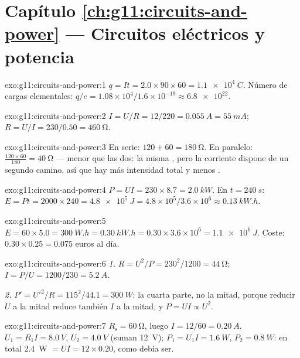 \section*{Capítulo \ref{ch:g11:circuits-and-power} --- Circuitos eléctricos y potencia}

\begin{solution}{exo:g11:circuits-and-power:1}
$q = It = 2.0 \times 90 \times 60 = \qty{1.1e4}{C}$. Número de cargas
elementales:
$q/e = 1.08\times10^{4}/1.6\times10^{-19} \approx \num{6.8e22}$.
\end{solution}

\begin{solution}{exo:g11:circuits-and-power:2}
$I = U/R = 12/220 = \qty{0.055}{A} = \qty{55}{mA}$;
$R = U/I = 230/0.50 = \qty{460}{\ohm}$.
\end{solution}

\begin{solution}{exo:g11:circuits-and-power:3}
En serie: $120 + 60 = \qty{180}{\ohm}$. En paralelo:
$\frac{120 \times 60}{180} = \qty{40}{\ohm}$ --- menor que las dos:
la misma , pero la corriente dispone de un segundo camino, así
que hay más intensidad total y menos .
\end{solution}

\begin{solution}{exo:g11:circuits-and-power:4}
$P = UI = 230 \times 8.7 = \qty{2.0}{kW}$. En $t = \qty{240}{s}$:
$E = Pt = 2000 \times 240 = \qty{4.8e5}{J} = 4.8\times10^{5}/3.6
\times10^{6} \approx \qty{0.13}{kW.h}$.
\end{solution}

\begin{solution}{exo:g11:circuits-and-power:5}
$E = 60 \times 5.0 = \qty{300}{W.h} = \qty{0.30}{kW.h} = 0.30 \times
3.6\times10^{6} = \qty{1.1e6}{J}$. Coste: $0.30 \times 0.25 = 0.075$
euros al día.
\end{solution}

\begin{solution}{exo:g11:circuits-and-power:6}
\emph{1.} $R = U^2/P = 230^2/1200 = \qty{44}{\ohm}$;
$I = P/U = 1200/230 = \qty{5.2}{A}$.

\emph{2.} $P' = U'^2/R = 115^2/44.1 = \qty{300}{W}$: la cuarta parte, no
la mitad, porque reducir $U$ a la mitad reduce también $I$ a la mitad, y
$P = UI \propto U^2$.
\end{solution}

\begin{solution}{exo:g11:circuits-and-power:7}
$R_{\text{s}} = \qty{60}{\ohm}$, luego $I = 12/60 = \qty{0.20}{A}$.
$U_1 = R_1 I = \qty{8.0}{V}$, $U_2 = \qty{4.0}{V}$ (suman \qty{12}{V});
$P_1 = U_1 I = \qty{1.6}{W}$, $P_2 = \qty{0.8}{W}$: en total
\qty{2.4}{W} $= UI = 12 \times 0.20$, como debía ser.
\end{solution}


